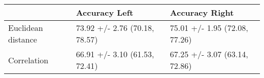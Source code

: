 \begin{tabular}{lll}
\toprule
{} &                  Accuracy Left &                 Accuracy Right \\
\midrule
Euclidean distance &  73.92 +/- 2.76 (70.18, 78.57) &  75.01 +/- 1.95 (72.08, 77.26) \\
Correlation        &  66.91 +/- 3.10 (61.53, 72.41) &  67.25 +/- 3.07 (63.14, 72.86) \\
\bottomrule
\end{tabular}
